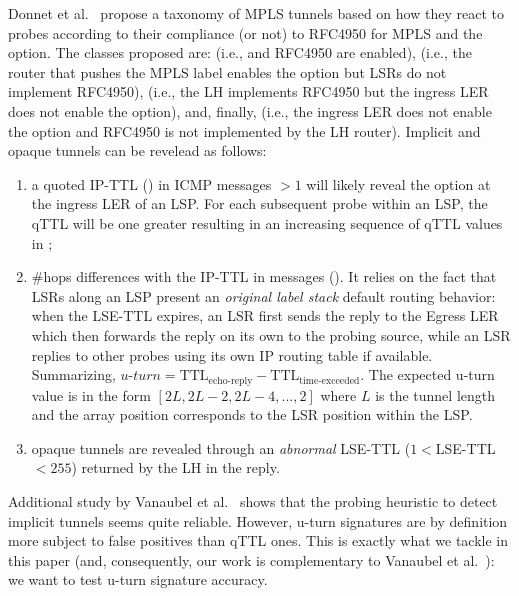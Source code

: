 Donnet et al.~\cite{Donnet12} propose a taxonomy of MPLS tunnels
based on how they react to \traceroute probes according to their compliance (or
not) to RFC4950 for MPLS and the \tpropagate option.  The classes proposed are:
 (i.e., \tpropagate and RFC4950 are enabled),
 (i.e., the router that pushes the MPLS label enables the
\tpropagate option but LSRs do not implement RFC4950), 
(i.e., the LH implements RFC4950 but the ingress LER does not enable the
\tpropagate option), and, finally,  (i.e., the ingress
LER does not enable the \tpropagate option and RFC4950 is not implemented by the
LH router).  Implicit and opaque tunnels can be revelead as follows:
\begin{enumerate}
  \item a quoted IP-TTL () in ICMP \ttlexceeded messages $>1$ will
  likely reveal the \tpropagate option at the ingress LER of an LSP. For each
  subsequent \traceroute probe within an LSP, the qTTL will be one greater
  resulting in an increasing sequence of qTTL values in \traceroute;
  \item  \#hops differences with the IP-TTL in \echoreply messages
  ().  It relies on the fact that LSRs along an LSP present an
  \textit{original label stack} default routing behavior: when the LSE-TTL
  expires, an LSR first sends the \ttlexceeded reply to the Egress LER which
  then forwards the reply on its own to the probing source, while an LSR
  replies to other probes using its own IP routing table if available. Summarizing, 
  $\textit{u-turn}=\text{TTL}_{\text{echo-reply}}-\text{TTL}_{\text{time-exceeded}}$.
  The expected u-turn value is in the form $[2L, 2L-2, 2L-4,..., 2]$ where $L$
  is the tunnel length and the array position corresponds to the LSR position
  within the LSP.
  \item opaque tunnels are revealed through an \textit{abnormal} LSE-TTL
  ($1<$LSE-TTL$<255$) returned by the LH in the \ttlexceeded reply.
\end{enumerate}

Additional study by Vanaubel et al.~\cite{VAN2013} shows that the probing
heuristic to detect implicit tunnels seems quite reliable.  However, u-turn
signatures are by definition more subject to false positives than qTTL ones. 
This is exactly what we tackle in this paper (and, consequently, our work is
complementary to Vanaubel et al.~\cite{VAN2013}): we want to test u-turn
signature accuracy.

